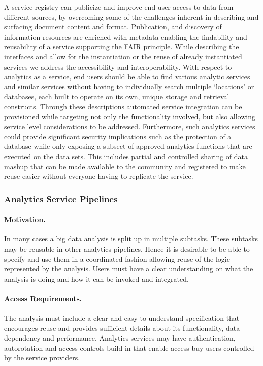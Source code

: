 \documentclass[12pt]{article}
\begin{document}
A service registry can publicize and improve end user access to data from different sources, by overcoming some of the challenges inherent in describing and surfacing document content and format. Publication, and discovery of information resources are enriched with metadata enabling the findability and reusability of a service supporting the FAIR principle. While describing the interfaces and allow for the instantiation or the reuse of already instantiated services we address the accessibility and interoperability. With respect to analytics as a service, end users should be able to find various analytic services and similar services without having to individually search multiple ‘locations’ or databases, each built to operate on its own, unique storage and retrieval constructs. Through these descriptions automated service integration can be provisioned while targeting not only the functionality involved, but also allowing service level considerations to be addressed. Furthermore, such analytics services could provide significant security implications such as the protection of a database while only exposing a subsect of approved analytics functions that are executed on the data sets. This includes partial and controlled sharing of data mashup that can be made available to the community and registered to make reuse easier without everyone having to replicate the service.




\subsubsection{Analytics Service Pipelines}

\paragraph{Motivation.} In many cases a big data analysis is split up in multiple subtasks. These subtasks may be reusable in other analytics pipelines. Hence it is desirable to be able to specify and use them in a coordinated fashion allowing reuse of the logic represented by the analysis. Users must have a clear understanding on what the analysis is doing and how it can be invoked and integrated. 

\paragraph{Access Requirements.} The analysis must include a clear and easy to understand specification that encourages reuse and provides sufficient details about its functionality, data dependency and performance. Analytics services may have authentication, autorotation and access controls build in that enable access buy users controlled by the service providers.
\end{document}
